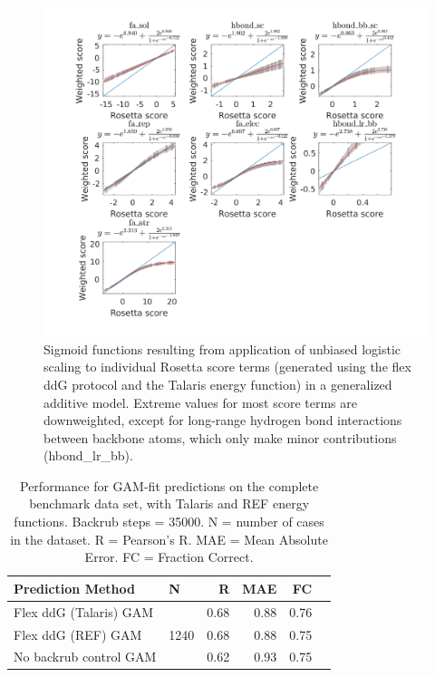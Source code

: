 \documentclass[journal=jpcbfk,manuscript=suppinfo]{achemso}
\begin{document}
\begin{figure}
  \centering
  \includegraphics[width=\textwidth,keepaspectratio]{figures/zemu-sigmoid2-tal-feats.png}
  \caption[Sigmoid fit Rosetta score function terms]{
    Sigmoid functions resulting from application of unbiased logistic scaling to individual Rosetta score terms (generated using the flex ddG protocol and the Talaris energy function\cite{song_structure-guided_2011,shapovalov_smoothed_2011,omeara_combined_2015}) in a generalized additive model. Extreme values for most score terms are downweighted, except for long-range hydrogen bond interactions between backbone atoms, which only make minor contributions (hbond\_lr\_bb). %
  } \label{fig:t14-fits-feats}
\end{figure}

\begin{table}
  \begin{tabular}{llrrrr}
\toprule
Prediction Method &     N &    R &  MAE &   FC \\
\midrule
 Flex ddG (Talaris) GAM & \multirow{ 4}{*}{1240} & 0.68 & 0.88 & 0.76 \\
 Flex ddG (REF) GAM & & 0.68 & 0.88 & 0.75  \\
 No backrub control GAM & & 0.62 & 0.93 & 0.75  \\
\bottomrule
\end{tabular}
  \caption[]{
    Performance for GAM-fit predictions on the complete benchmark data set, with Talaris\cite{song_structure-guided_2011,shapovalov_smoothed_2011,omeara_combined_2015} and REF\cite{alford_rosetta_2017} energy functions. Backrub steps = 35000. N = number of cases in the dataset. R = Pearson's R. MAE = Mean Absolute Error. FC = Fraction Correct.
  } \label{tab:table-gam-fit}
\end{table}
\end{document}
